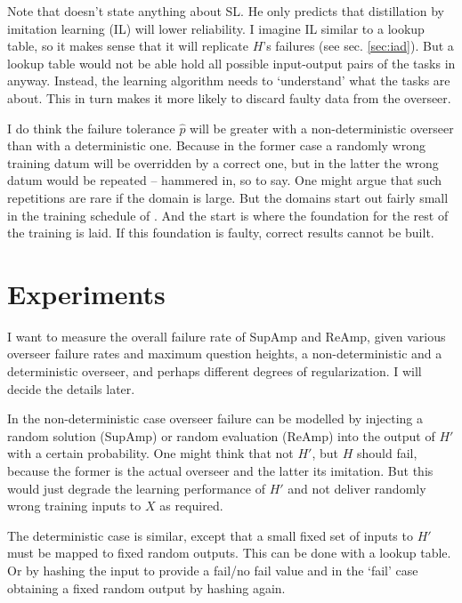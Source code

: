 \documentclass{farlamp}
\begin{document}
Note that \textcite{ChriRelAmp} doesn't state anything about SL. He only
predicts that distillation by imitation learning (IL) will lower reliability. I
imagine IL similar to a lookup table, so it makes sense that it will replicate
$H$'s failures (see sec. \ref{sec:iad}). But a lookup table would not be able
hold all possible input-output pairs of the tasks in \textcite{CSASupAmp}
anyway. Instead, the learning algorithm needs to ‘understand’ what the tasks are
about. This in turn makes it more likely to discard faulty data from the
overseer.

I do think the failure tolerance $\hat{p}$ will be greater with a
non-deterministic overseer than with a deterministic one. Because in the former
case a randomly wrong training datum will be overridden by a correct one, but in
the latter the wrong datum would be repeated – hammered in, so to say. One might
argue that such repetitions are rare if the domain is large. But the domains
start out fairly small in the training schedule of \textcite{CSASupAmp}. And the
start is where the foundation for the rest of the training is laid. If this
foundation is faulty, correct results cannot be built.


\section{Experiments}

I want to measure the overall failure rate of SupAmp and ReAmp, given various
overseer failure rates and maximum question heights, a non-deterministic and a
deterministic overseer, and perhaps different degrees of regularization. I will
decide the details later.

In the non-deterministic case overseer failure can be modelled by injecting a
random solution (SupAmp) or random evaluation (ReAmp) into the output of $H'$
with a certain probability. One might think that not $H'$, but $H$ should fail,
because the former is the actual overseer and the latter its imitation. But this
would just degrade the learning performance of $H'$ and not deliver randomly
wrong training inputs to $X$ as required.

The deterministic case is similar, except that a small fixed set of inputs to
$H'$ must be mapped to fixed random outputs. This can be done with a lookup
table. Or by hashing the input to provide a fail/no fail value and in the ‘fail’
case obtaining a fixed random output by hashing again.


\begin{FlushLeft}
\printbibliography
\end{FlushLeft}
\end{document}
